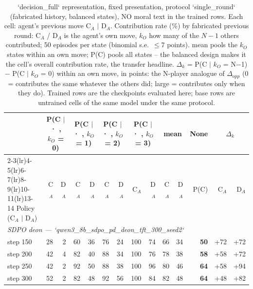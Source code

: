 \begin{table}[t]
\centering
\caption{`decision_full` representation, fixed presentation, protocol `single_round` (fabricated history, balanced states), NO moral text in the trained rows. Each cell: agent's previous move C$_A$ $\mid$ D$_A$. Contribution rate (\%) by fabricated previous round: C$_A$ / D$_A$ is the agent's own move, $k_O$ how many of the $N-1$ others contributed; 50 episodes per state (binomial s.e.\ $\leq$7 points). mean pools the $k_O$ states within an own move; P(C) pools all states -- the balanced design makes it the cell's overall contribution rate, the transfer headline. $\Delta_k$ = P(C $\mid$ $k_O$ = N$-$1) $-$ P(C $\mid$ $k_O$ = 0) within an own move, in points: the N-player analogue of $\Delta_{opp}$ (0 = contributes the same whatever the others did; large = contributes only when they do). Trained rows are the checkpoints evaluated here; base rows are untrained cells of the same model under the same protocol.}
\label{tab:transfer}
\small
\setlength{\tabcolsep}{3.5pt}
\begin{tabular}{lrrrrrrrrrrrrr}
\toprule
 & \multicolumn{2}{c}{P(C $\mid$ · , $k_O$ = 0)} & \multicolumn{2}{c}{P(C $\mid$ · , $k_O$ = 1)} & \multicolumn{2}{c}{P(C $\mid$ · , $k_O$ = 2)} & \multicolumn{2}{c}{P(C $\mid$ · , $k_O$ = 3)} & \multicolumn{2}{c}{mean} & \multicolumn{1}{c}{None} & \multicolumn{2}{c}{$\Delta_k$} \\
\cmidrule(lr){2-3}\cmidrule(lr){4-5}\cmidrule(lr){6-7}\cmidrule(lr){8-9}\cmidrule(lr){10-11}\cmidrule(lr){13-14}
Policy (C$_A$ $\mid$ D$_A$) & C$_A$ & D$_A$ & C$_A$ & D$_A$ & C$_A$ & D$_A$ & C$_A$ & D$_A$ & C$_A$ & D$_A$ & P(C) & C$_A$ & D$_A$ \\
\midrule
\multicolumn{14}{l}{\emph{SDPO deon — `qwen3_8b_sdpo_pd_deon_tft_300_seed2`}} \\
step 150 & 28 & 2 & 60 & 36 & 76 & 24 & 100 & 74 & 66 & 34 & \textbf{50} & +72 & +72 \\
step 200 & 42 & 4 & 82 & 40 & 88 & 34 & 100 & 76 & 78 & 38 & \textbf{58} & +58 & +72 \\
step 250 & 42 & 2 & 92 & 50 & 88 & 38 & 100 & 96 & 80 & 46 & \textbf{64} & +58 & +94 \\
step 300 & 52 & 2 & 82 & 48 & 92 & 56 & 100 & 84 & 82 & 48 & \textbf{64} & +48 & +82 \\
\bottomrule
\end{tabular}
\end{table}
